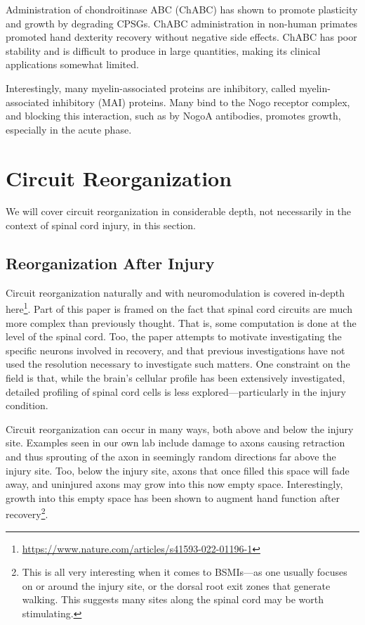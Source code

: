 \documentclass[12pt]{report}
\begin{document}
Administration of chondroitinase ABC (ChABC) has shown to promote plasticity and growth by degrading CPSGs. ChABC administration in non-human primates promoted hand dexterity recovery without negative side effects. ChABC has poor stability and is difficult to produce in large quantities, making its clinical applications somewhat limited.\newline  

Interestingly, many myelin-associated proteins are inhibitory, called myelin-associated inhibitory (MAI) proteins. Many bind to the Nogo receptor complex, and blocking this interaction, such as by NogoA antibodies, promotes growth, especially in the acute phase. 



\chapter{Circuit Reorganization}

We will cover circuit reorganization in considerable depth, not necessarily in the context of spinal cord injury, in this section. 

\section{Reorganization After Injury}


Circuit reorganization naturally and with neuromodulation is covered in-depth here\footnote{\url{https://www.nature.com/articles/s41593-022-01196-1}}. Part of this paper is framed on the fact that spinal cord circuits are much more complex than previously thought. That is, some computation is done at the level of the spinal cord. Too, the paper attempts to motivate investigating the specific neurons involved in recovery, and that previous investigations have not used the resolution necessary to investigate such matters. One constraint on the field is that, while the brain's cellular profile has been extensively investigated, detailed profiling of spinal cord cells is less explored---particularly in the injury condition.\newline

Circuit reorganization can occur in many ways, both above and below the injury site. Examples seen in our own lab include damage to axons causing retraction and thus sprouting of the axon in seemingly random directions far above the injury site. Too, below the injury site, axons that once filled this space will fade away, and uninjured axons may grow into this now empty space. Interestingly, growth into this empty space has been shown to augment hand function after recovery\footnote{This is all very interesting when it comes to BSMIs---as one usually focuses on or around the injury site, or the dorsal root exit zones that generate walking. This suggests many sites along the spinal cord may be worth stimulating.}.\newline
\end{document}

